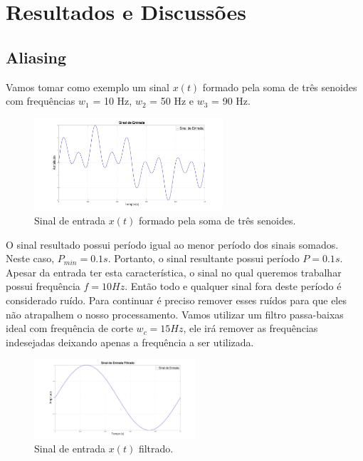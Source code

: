 \documentclass[journal]{IEEEtran}
\begin{document}
\section{Resultados e Discussões}

\subsection{Aliasing}

Vamos tomar como exemplo um sinal $x(t)$ formado pela soma de três senoides com frequências $w_1$ = 10 Hz, $w_2$ = 50 Hz e $w_3$ = 90 Hz.

\begin{figure}[H]
\captionsetup{justification=centering}
\centering %
\includegraphics[width=7cm]{sinal_entrada_00.jpg} %
\caption{Sinal de entrada $x(t)$ formado pela soma de três senoides.}
\end{figure}

O sinal resultado possui período igual ao menor período dos sinais somados. Neste caso, $P_{min} = 0.1s$. Portanto, o sinal resultante possui período $P = 0.1s$. Apesar da entrada ter esta característica, o sinal no qual queremos trabalhar possui frequência $f = 10Hz$. Então todo e qualquer sinal fora deste período é considerado ruído. Para continuar é preciso remover esses ruídos para que eles não atrapalhem o nosso processamento. Vamos utilizar um filtro passa-baixas ideal com frequência de corte $w_c = 15Hz$, ele irá remover as frequências indesejadas deixando apenas a frequência a ser utilizada.

\begin{figure}[H]
\captionsetup{justification=centering}
\centering %
\includegraphics[width=6cm]{sinal_filtrado_00.jpg} %
\caption{Sinal de entrada $x(t)$ filtrado.}
\end{figure}
\end{document}
